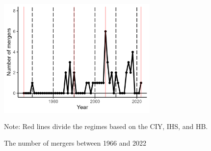 \documentclass[10pt]{article}
\begin{document}
\begin{figure}[!ht]
\begin{center}
  \includegraphics[width = 0.7\textwidth]
  {figuretable/number_of_mergers.png}
  \caption{The number of mergers between 1966 and 2022}
  \label{fg:number_of_mergers}
  \end{center}
\footnotesize
   Note: Red lines divide the regimes based on the CIY, IHS, and HB.
\end{figure}
\end{document}
